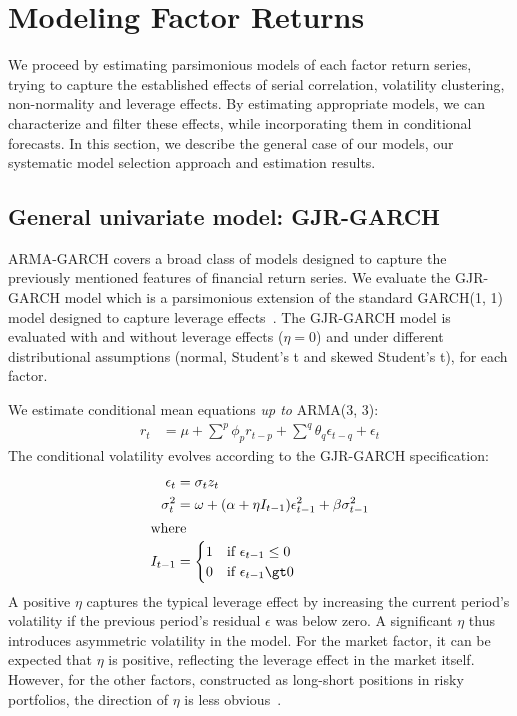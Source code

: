 
\section{Modeling Factor Returns} %
\label{sec:modeling_factor_returns}

We proceed by estimating parsimonious models of each factor return series, trying to capture the established effects of serial correlation, volatility clustering, non-normality and leverage effects. By estimating appropriate models, we can characterize and filter these effects, while incorporating them in conditional forecasts. In this section, we describe the general case of our models, our systematic model selection approach and estimation results.

\subsection{General univariate model: GJR-GARCH} %
\label{sub:general_univariate_model_gjr_garch}

ARMA-GARCH covers a broad class of models designed to capture the previously mentioned features of financial return series. We evaluate the GJR-GARCH model which is a parsimonious extension of the standard GARCH(1, 1) model designed to capture leverage effects~\autocite{glosten1993relation}. The GJR-GARCH model is evaluated with and without leverage effects ($\eta = 0$) and under different distributional assumptions (normal, Student's t and skewed Student's t), for each factor.

We estimate conditional mean equations \emph{up to} ARMA(3, 3):
\begin{align}
  r_t &=
    \mu +
    \sum^p \phi_p r_{t - p} +
    \sum^q \theta_q \epsilon_{t - q} + 
    \epsilon_t
\end{align}
The conditional volatility evolves according to the GJR-GARCH specification:
\begin{align}
  \epsilon_t &= \sigma_t z_t \\\
  \sigma_t^2 &=
    \omega +
    (\alpha + \eta I_{t - 1}) \epsilon_{t - 1}^2 +
    \beta \sigma^2_{t - 1} \\
  \intertext{where}
  I_{t - 1} &=
    \begin{cases}
      1 & \text{if}\ \epsilon_{t - 1} \le 0 \\
      0 & \text{if}\ \epsilon_{t - 1} \gt 0      
    \end{cases}
\end{align}
A positive $\eta$ captures the typical leverage effect by increasing the current period's volatility if the previous period's residual $\epsilon$ was below zero. A significant $\eta$ thus introduces asymmetric volatility in the model. For the market factor, it can be expected that $\eta$ is positive, reflecting the leverage effect in the market itself. However, for the other factors, constructed as long-short positions in risky portfolios, the direction of $\eta$ is less obvious~\autocite{ChristoffersenLanglois2013}.

